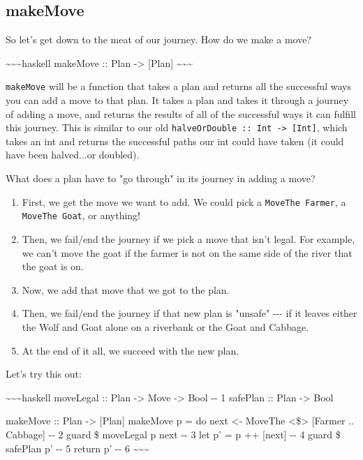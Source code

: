 \documentclass[]{article}
\begin{document}
\subsection{makeMove}

So let's get down to the meat of our journey. How do we make a move?

\textasciitilde{}\textasciitilde{}\textasciitilde{}haskell makeMove :: Plan
-\textgreater{} {[}Plan{]} \textasciitilde{}\textasciitilde{}\textasciitilde{}

\texttt{makeMove} will be a function that takes a plan and returns all the
successful ways you can add a move to that plan. It takes a plan and takes it
through a journey of adding a move, and returns the results of all of the
successful ways it can fulfill this journey. This is similar to our old
\texttt{halveOrDouble\ ::\ Int\ -\textgreater{}\ {[}Int{]}}, which takes an int
and returns the successful paths our int could have taken (it could have been
halved...or doubled).

What does a plan have to "go through" in its journey in adding a move?

\begin{enumerate}
\tightlist
\item
  First, we get the move we want to add. We could pick a
  \texttt{MoveThe\ Farmer}, a \texttt{MoveThe\ Goat}, or anything!
\item
  Then, we fail/end the journey if we pick a move that isn't legal. For example,
  we can't move the goat if the farmer is not on the same side of the river that
  the goat is on.
\item
  Now, we add that move that we got to the plan.
\item
  Then, we fail/end the journey if that new plan is "unsafe" -\/-\/- if it
  leaves either the Wolf and Goat alone on a riverbank or the Goat and Cabbage.
\item
  At the end of it all, we succeed with the new plan.
\end{enumerate}

Let's try this out:

\textasciitilde{}\textasciitilde{}\textasciitilde{}haskell moveLegal :: Plan
-\textgreater{} Move -\textgreater{} Bool -\/- 1 safePlan :: Plan
-\textgreater{} Bool

makeMove :: Plan -\textgreater{} {[}Plan{]} makeMove p = do next \textless{}-
MoveThe \textless{}\$\textgreater{} {[}Farmer .. Cabbage{]} -\/- 2 guard \$
moveLegal p next -\/- 3 let p' = p ++ {[}next{]} -\/- 4 guard \$ safePlan p'
-\/- 5 return p' -\/- 6 \textasciitilde{}\textasciitilde{}\textasciitilde{}
\end{document}
